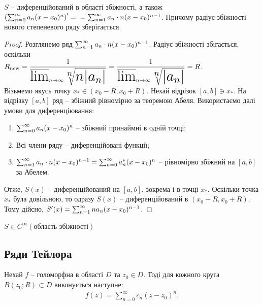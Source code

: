 \documentclass{math_library}
\begin{document}
\begin{theorem}
$S$ -- диференційований в області збіжності, а також $\huge \left( \sum_{n=0}^\infty a_n(x-x_0)^n \right)' = \\ = \sum_{n=1}^\infty a_n\cdot n(x-x_0)^{n-1}$. Причому радіус збіжності нового степеневого ряду зберігається.
\end{theorem}

\begin{proof}
Розглянемо ряд $\huge \sum_{n=1}^\infty a_n\cdot n(x-x_0)^{n-1}$. Радіус збіжності збігається, оскільки\\
$ R_{\text{new}} = \dfrac{1}{\huge \varlimsup_{n \to \infty} \sqrt[n]{n |a_n|}} = \dfrac{1}{\huge \varlimsup_{n \to \infty} \sqrt[n]{|a_n|}} = R$.\\
Візьмемо якусь точку $x_* \in (x_0-R,x_0+R)$. Нехай відрізок $[a,b] \ni x_*$. На відрізку $[a,b]$ ряд -- збіжний рівномірно за теоремою Абеля. Використаємо далі умови для диференціювання:
\begin{enumerate}[nosep,wide=0pt,label={\arabic*)}]
\item $\huge \sum_{n=0}^\infty a_n(x-x_0)^n$ -- збіжний принаймні в одній точці;\\
\item Всі члени ряду -- диференційовані функції;\\
\item $\huge \sum_{n=1}^\infty a_n \cdot n(x-x_0)^{n-1} = \huge\sum_{n=0}^\infty a_n^* (x-x_0)^n$ -- рівномірно збіжний на $[a,b]$ за Абелем.
\end{enumerate}
Отже, $S(x)$ -- диференційований на $[a,b]$, зокрема і в точці $x_*$. Оскільки точка $x_*$ була довільною, то одразу $S(x)$ -- диференційований в $(x_0-R,x_0+R)$.\\
Тому дійсно, $S'(x) = \huge \sum_{n=1}^\infty n a_n (x-x_0)^{n-1}$.
\end{proof}

\begin{corollary}
$S \in C^{\infty}(\text{область збіжності})$
\end{corollary}
\fi

\subsection{Ряди Тейлора}
\begin{theorem}
Нехай $f$ -- голоморфна в області $D$ та $z_0 \in D$. Тоді для кожного круга $B(z_0;R) \subset D$ виконується наступне:
\begin{align*}
f(z) = \sum_{n=0}^\infty c_n(z-z_0)^n.
\end{align*} 
\end{theorem}
\end{document}

